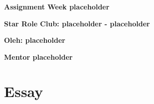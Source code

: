 \documentclass[12pt, a4paper]{article}
\date{}
\begin{document}
  \begin{flushleft}

    \textbf{Assignment Week placeholder }
    \linebreak

    \textbf{Star Role Club: placeholder - placeholder}
    \linebreak

    \textbf{Oleh: placeholder}

    \textbf{Mentor placeholder}

  \end{flushleft}

  \section*{Essay}
\end{document}
